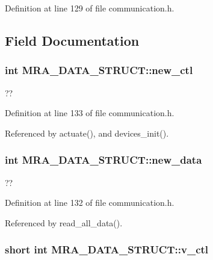 Definition at line 129 of file communication.\-h.



\subsection{Field Documentation}
\hypertarget{structMRA__DATA__STRUCT_a5b1af89ee717f5b14c18e8ac12e93e75}{
\subsubsection[{new\-\_\-ctl}]{\setlength{\rightskip}{0pt plus 5cm}int M\-R\-A\-\_\-\-D\-A\-T\-A\-\_\-\-S\-T\-R\-U\-C\-T\-::new\-\_\-ctl}}\label{structMRA__DATA__STRUCT_a5b1af89ee717f5b14c18e8ac12e93e75}


?? 



Definition at line 133 of file communication.\-h.



Referenced by actuate(), and devices\-\_\-init().

\hypertarget{structMRA__DATA__STRUCT_afca6e851d302f3a786885a4e1eec79d7}{
\subsubsection[{new\-\_\-data}]{\setlength{\rightskip}{0pt plus 5cm}int M\-R\-A\-\_\-\-D\-A\-T\-A\-\_\-\-S\-T\-R\-U\-C\-T\-::new\-\_\-data}}\label{structMRA__DATA__STRUCT_afca6e851d302f3a786885a4e1eec79d7}


?? 



Definition at line 132 of file communication.\-h.



Referenced by read\-\_\-all\-\_\-data().

\hypertarget{structMRA__DATA__STRUCT_a64b4e6bb604e58de593a60c87942b966}{
\subsubsection[{v\-\_\-ctl}]{\setlength{\rightskip}{0pt plus 5cm}short int M\-R\-A\-\_\-\-D\-A\-T\-A\-\_\-\-S\-T\-R\-U\-C\-T\-::v\-\_\-ctl}}\label{structMRA__DATA__STRUCT_a64b4e6bb604e58de593a60c87942b966}


